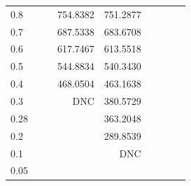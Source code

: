 \begin{landscape}
\begin{table}
\begin{center}
\begin{tabular}{l|rrrrrrrr}
0.8 &			&			&  754.8382 &  751.2877  \\ 
0.7 &			&			&  687.5338 &  683.6708  \\ 
0.6 &			&			&  617.7467 &  613.5518  \\ 
0.5 &			&			&  544.8834 &  540.3430  \\ 
0.4 &			&			&  468.0504 &  463.1638  \\ 
0.3 &			&			&       DNC &  380.5729  \\ 
0.28 &			&			&			&  363.2048  \\ 
0.2 &			&			&			&  289.8539  \\ 
0.1 &			&			&			&       DNC  \\ 
0.05 &  \\
\hline \hline
\end{tabular}
\end{center}
\end{table}
\end{landscape}



















